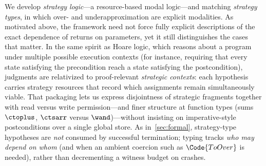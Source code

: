 We develop \emph{strategy logic}---a resource-based modal logic---and matching \emph{strategy types}, in which over- and underapproximation are explicit modalities. As motivated above, the framework need not force fully explicit descriptions of the exact dependence of returns on parameters, yet it still distinguishes the cases that matter. In the same spirit as Hoare logic, which reasons about a program under multiple possible execution contexts (for instance, requiring that every state satisfying the precondition reach a state satisfying the postcondition), judgments are relativized to proof-relevant \emph{strategic contexts}: each hypothesis carries strategy resources that record which assignments remain simultaneously viable. That packaging lets us express disjointness of strategic fragments together with read versus write permission---and finer structure at function types (sums \(\ctoplus\), \(\ctsarr\) versus \(\wand\))---without insisting on imperative-style postconditions over a single global store.
As in~\autoref{sec:formal}, strategy-type hypotheses are \emph{not} consumed by successful termination; typing tracks \emph{who may depend on whom} (and when an ambient coercion such as \(\Code{ToOver}\) is needed), rather than decrementing a witness budget on crashes.

